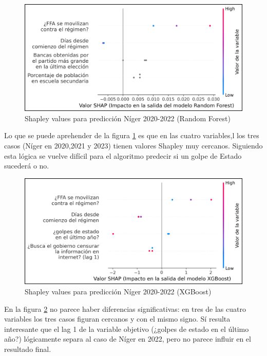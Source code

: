 \documentclass{article}
\begin{document}
\begin{figure}[H]
  \centering
  \includegraphics[width=1\textwidth]{11_shapley_values_rf_niger.png}
  \caption{Shapley values para predicción Níger 2020-2022 (Random Forest)\label{fig:shapley_rf_niger}}
\end{figure}

Lo que se puede aprehender de la figura \ref{fig:shapley_rf_niger} es que en las cuatro variables,l
los tres casos (Níger en 2020,2021 y 2023) tienen valores Shapley muy cercanos. Siguiendo esta lógica
se vuelve difícil para el algoritmo predecir si un golpe de Estado sucederá o no.

\begin{figure}[H]
  \centering
  \includegraphics[width=1\textwidth]{12_shapley_values_xgb_niger.png}
  \caption{Shapley values para predicción Níger 2020-2022 (XGBoost)\label{fig:shapley_xgb_niger}}
\end{figure}

En la figura \ref{fig:shapley_xgb_niger} no parece haber diferencias significativas: en tres de las
cuatro variables los tres casos figuran cercanos y con el mismo signo. Sí resulta interesante que el
lag 1 de la variable objetivo (¿golpes de estado en el último año?) lógicamente separa al caso de
Níger en 2022, pero no parece influir en el resultado final.
\end{document}
